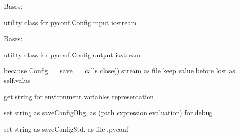 \documentclass[a4paper,10pt,english]{sphinxmanual}
\begin{document}
\begin{fulllineitems}
\label{commands/apidoc/src:src.debug.InStream}
Bases: 

utility class for pyconf.Config input iostream

\end{fulllineitems}


\begin{fulllineitems}
\label{commands/apidoc/src:src.debug.OutStream}
Bases: 

utility class for pyconf.Config output iostream

\begin{fulllineitems}
\label{commands/apidoc/src:src.debug.OutStream.close}
because Config.\_\_save\_\_ calls close() stream as file
keep value before lost as self.value

\end{fulllineitems}


\end{fulllineitems}


\begin{fulllineitems}
\label{commands/apidoc/src:src.debug.getLocalEnv}
get string for environment variables representation

\end{fulllineitems}


\begin{fulllineitems}
\label{commands/apidoc/src:src.debug.getStrConfigDbg}
set string as saveConfigDbg, 
as (path expression evaluation) for debug

\end{fulllineitems}


\begin{fulllineitems}
\label{commands/apidoc/src:src.debug.getStrConfigStd}
set string as saveConfigStd, as file .pyconf

\end{fulllineitems}
\end{document}
